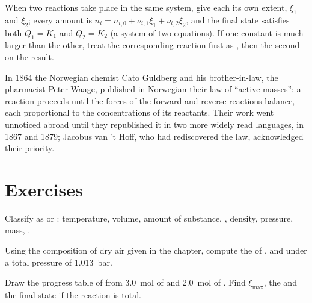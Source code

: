 \begin{method}\label{met:b1:extent-q-and-k:two-reactions}
When two reactions take place in the same system, give each its own
extent, $\xi_1$ and $\xi_2$; every amount is $n_i = n_{i,0} + \nu_{i,1}\xi_1
+ \nu_{i,2}\xi_2$, and the final state satisfies both $Q_1 = K_1^\circ$ and
$Q_2 = K_2^\circ$ (a system of two equations). If one constant is much
larger than the other, treat the corresponding reaction first as
, then the second on the result.
\end{method}

\begin{history}
In 1864 the Norwegian chemist Cato Guldberg and his brother-in-law, the
pharmacist Peter Waage, published in Norwegian their law of ``active
masses'': a reaction proceeds until the forces of the forward and reverse
reactions balance, each proportional to the concentrations of its
reactants. Their work went unnoticed abroad until they republished it in two more
widely read languages, in 1867 and 1879; Jacobus van 't Hoff, who had
rediscovered the law, acknowledged their priority.
\end{history}

\section{Exercises}

\begin{exercise}[$\star$]\label{exo:b1:extent-q-and-k:1}
Classify as  or : temperature, volume, amount of
substance, , density, pressure, mass, .
\end{exercise}

\begin{exercise}[$\star$]\label{exo:b1:extent-q-and-k:2}
Using the composition of dry air given in the chapter, compute the
 of ,  and  under a total pressure
of \qty{1.013}{bar}.
\end{exercise}

\begin{exercise}[$\star$]\label{exo:b1:extent-q-and-k:3}
Draw the progress table of  from \qty{3.0}{mol} of
 and \qty{2.0}{mol} of . Find $\xi_{\max}$, the  and the final state if the reaction is total.
\end{exercise}

